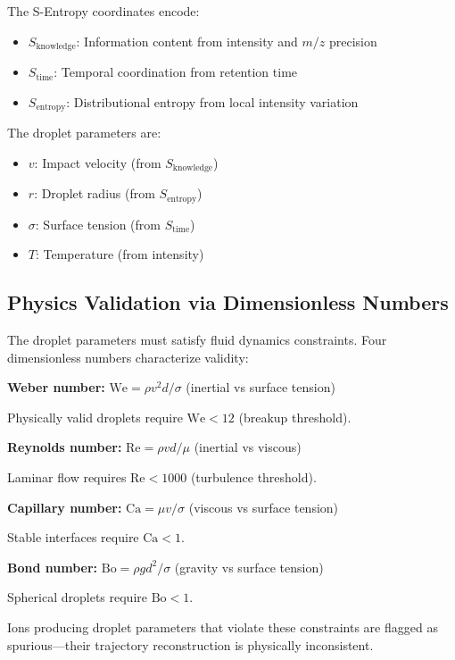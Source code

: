 \documentclass[twocolumn,10pt]{article}
\theoremstyle{remark}
\begin{document}
The S-Entropy coordinates encode:
\begin{itemize}
    \item $S_{\text{knowledge}}$: Information content from intensity and $m/z$ precision
    \item $S_{\text{time}}$: Temporal coordination from retention time
    \item $S_{\text{entropy}}$: Distributional entropy from local intensity variation
\end{itemize}

The droplet parameters are:
\begin{itemize}
    \item $v$: Impact velocity (from $S_{\text{knowledge}}$)
    \item $r$: Droplet radius (from $S_{\text{entropy}}$)
    \item $\sigma$: Surface tension (from $S_{\text{time}}$)
    \item $T$: Temperature (from intensity)
\end{itemize}

\subsection{Physics Validation via Dimensionless Numbers}

The droplet parameters must satisfy fluid dynamics constraints. Four dimensionless numbers characterize validity:

\textbf{Weber number:} $\text{We} = \rho v^2 d / \sigma$ (inertial vs surface tension) \cite{weber1931zerfall}

Physically valid droplets require $\text{We} < 12$ (breakup threshold).

\textbf{Reynolds number:} $\text{Re} = \rho v d / \mu$ (inertial vs viscous) \cite{reynolds1883experimental}

Laminar flow requires $\text{Re} < 1000$ (turbulence threshold).

\textbf{Capillary number:} $\text{Ca} = \mu v / \sigma$ (viscous vs surface tension)

Stable interfaces require $\text{Ca} < 1$.

\textbf{Bond number:} $\text{Bo} = \rho g d^2 / \sigma$ (gravity vs surface tension)

Spherical droplets require $\text{Bo} < 1$.

Ions producing droplet parameters that violate these constraints are flagged as spurious---their trajectory reconstruction is physically inconsistent.
\end{document}
